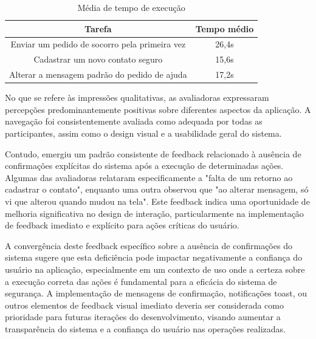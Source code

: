 \begin{table}[htbp]
	\centering
	\caption[Média de tempo de execução]{Média de tempo de execução}
	\label{tab:mediadetempo}
	\begin{tabular}{cc}
		\hline
		\multicolumn{1}{|c|}{Tarefa}                                        & \multicolumn{1}{c|}{Tempo médio}            \\ \hline \hline
		\multicolumn{1}{|c|}{Enviar um pedido de socorro pela primeira vez} & \multicolumn{1}{c|}{26,4s} \\ \hline
		\multicolumn{1}{|c|}{Cadastrar um novo contato seguro}              & \multicolumn{1}{c|}{15,6s} \\ \hline
		\multicolumn{1}{|c|}{Alterar a mensagem padrão do pedido de ajuda}  & \multicolumn{1}{c|}{17,2s} \\ \hline
	\end{tabular}
\end{table}


No que se refere às impressões qualitativas, as avaliadoras expressaram percepções predominantemente positivas sobre diferentes aspectos da aplicação. A navegação foi consistentemente avaliada como adequada por todas as participantes, assim como o design visual e a usabilidade geral do sistema.

Contudo, emergiu um padrão consistente de feedback relacionado à ausência de confirmações explícitas do sistema após a execução de determinadas ações. Algumas das avaliadoras relataram especificamente a "falta de um retorno ao cadastrar o contato", enquanto uma outra observou que "ao alterar mensagem, só vi que alterou quando mudou na tela". Este feedback indica uma oportunidade de melhoria significativa no design de interação, particularmente na implementação de feedback imediato e explícito para ações críticas do usuário.

A convergência deste feedback específico sobre a ausência de confirmações do sistema sugere que esta deficiência pode impactar negativamente a confiança do usuário na aplicação, especialmente em um contexto de uso onde a certeza sobre a execução correta das ações é fundamental para a eficácia do sistema de segurança. A implementação de mensagens de confirmação, notificações toast, ou outros elementos de feedback visual imediato deveria ser considerada como prioridade para futuras iterações do desenvolvimento, visando aumentar a transparência do sistema e a confiança do usuário nas operações realizadas.